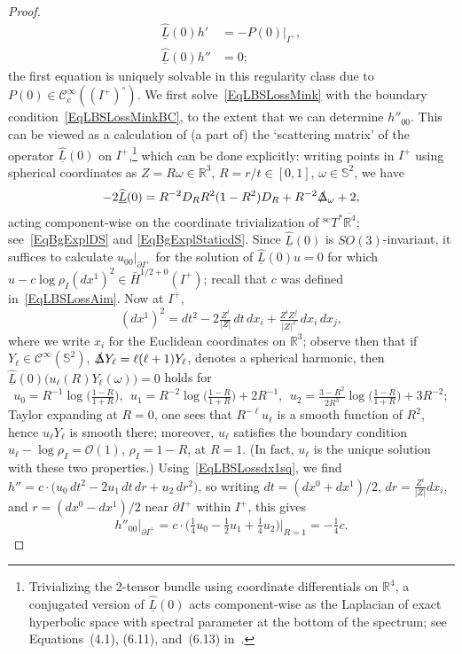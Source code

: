 \documentclass[reqno,11pt,letterpaper]{amsart}
\numberwithin{equation}{section}
\numberwithin{figure}{section}
\theoremstyle{definition}
\theoremstyle{remark}
\newcommand{\mc}{\mathcal}
\newcommand{\cC}{\mc C}
\newcommand{\cO}{\mc O}
\newcommand{\R}{\mathbb{R}}
\newcommand{\Sph}{\mathbb{S}}
\newcommand{\slDelta}{\slashed{\Delta}{}}
\newcommand{\ol}{\overline}
\newcommand{\pa}{\partial}
\newcommand{\ul}[1]{\underline{#1}{}}
\newcommand{\wh}{\widehat}
\newcommand{\cp}{{\mathrm{c}}}
\newcommand{\scl}{{\mathrm{sc}}}
\newcommand{\Tsc}{{}^{\scl}T}
\newcommand{\CI}{\cC^\infty}
\newcommand{\CIc}{\cC^\infty_\cp}
\newcommand{\Hext}{\bar H}
\begin{document}
\begin{proof}
  \begin{align}
  \label{EqLBSLossSchw}
    \wh{\ul L}(0)h' &= -P(0)|_{I^+}, \\
  \label{EqLBSLossMink}
    \wh{\ul L}(0)h'' &= 0;
  \end{align}
  the first equation is uniquely solvable in this regularity class due to $P(0)\in\CIc((I^+)^\circ)$. We first solve~\eqref{EqLBSLossMink} with the boundary condition~\eqref{EqLBSLossMinkBC}, to the extent that we can determine $h''_{0 0}$. This can be viewed as a calculation of (a part of) the `scattering matrix' of the operator $\wh{\ul L}(0)$ on $I^+$,\footnote{Trivializing the 2-tensor bundle using coordinate differentials on $\R^4$, a conjugated version of $\wh{\ul L}(0)$ acts component-wise as the Laplacian of exact hyperbolic space with spectral parameter at the bottom of the spectrum; see Equations~(4.1), (6.11), and~(6.13) in~\cite{HintzZworskiHypObs}.} which can be done explicitly: writing points in $I^+$ using spherical coordinates as $Z=R\omega\in\R^3$, $R=r/t\in[0,1]$, $\omega\in\Sph^2$, we have
  \[
    -2\wh{\ul L}(0) = R^{-2}D_R R^2(1-R^2)D_R + R^{-2}\slDelta_\omega + 2,
  \]
  acting component-wise on the coordinate trivialization of $\Tsc^*\ol{\R^4}$; see~\eqref{EqBgExplDS} and \eqref{EqBgExplStaticdS}. Since $\wh{\ul L}(0)$ is $SO(3)$-invariant, it suffices to calculate $u_{0 0}|_{\pa I^+}$ for the solution of $\wh{\ul L}(0)u=0$ for which $u-c\log\rho_I(d x^1)^2\in\Hext^{1/2+0}(I^+)$; recall that $c$ was defined in~\eqref{EqLBSLossAim}. Now at $I^+$,
  \begin{equation}
  \label{EqLBSLossdx1sq}
    (d x^1)^2 = d t^2 - 2\tfrac{Z^i}{|Z|}\,d t\,d x_i + \tfrac{Z^i Z^j}{|Z|^2}\,d x_i\,d x_j,
  \end{equation}
  where we write $x_i$ for the Euclidean coordinates on $\R^3$; observe then that if $Y_\ell\in\CI(\Sph^2)$, $\slDelta Y_\ell=\ell(\ell+1)Y_\ell$, denotes a spherical harmonic, then $\wh{\ul L}(0)\bigl(u_\ell(R) Y_\ell(\omega)\bigr) = 0$ holds for
  \begin{equation}
  \label{EqLBSLossODE}
    u_0=R^{-1}\log\bigl(\tfrac{1-R}{1+R}\bigr),\ \ 
    u_1=R^{-2}\log\bigl(\tfrac{1-R}{1+R}\bigr)+2 R^{-1},\ \ 
    u_2=\tfrac{3-R^2}{2 R^3}\log\bigl(\tfrac{1-R}{1+R}\bigr)+3 R^{-2};
  \end{equation}
  Taylor expanding at $R=0$, one sees that $R^{-\ell}u_\ell$ is a smooth function of $R^2$, hence $u_\ell Y_\ell$ is smooth there; moreover, $u_\ell$ satisfies the boundary condition $u_\ell-\log\rho_I=\cO(1)$, $\rho_I=1-R$, at $R=1$. (In fact, $u_\ell$ is the unique solution with these two properties.) Using~\eqref{EqLBSLossdx1sq}, we find $h''=c\cdot\bigl(u_0\,d t^2-2 u_1\,d t\,d r+u_2\,d r^2\bigr)$, so writing $d t=(d x^0+d x^1)/2$, $d r=\frac{Z^i}{|Z|}d x_i$, and $r=(d x^0-d x^1)/2$ near $\pa I^+$ within $I^+$, this gives
  \begin{equation}
  \label{EqLBSLossHdbl}
    h''_{0 0}|_{\pa I^+} = c\cdot\bigl(\tfrac14 u_0 - \tfrac12 u_1 + \tfrac14 u_2\bigr)\big|_{R=1} = -\tfrac14 c.
  \end{equation}


\end{proof}
\end{document}
